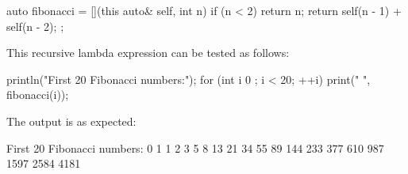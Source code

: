 \begin{cpp}
auto fibonacci = [](this auto& self, int n) {
    if (n < 2) { return n; }
    return self(n - 1) + self(n - 2);
};
\end{cpp}

This recursive lambda expression can be tested as follows:

\begin{cpp}
println("First 20 Fibonacci numbers:");
for (int i { 0 }; i < 20; ++i) { print("{} ", fibonacci(i)); }
\end{cpp}

The output is as expected:

\begin{shell}
First 20 Fibonacci numbers:
0 1 1 2 3 5 8 13 21 34 55 89 144 233 377 610 987 1597 2584 4181
\end{shell}







